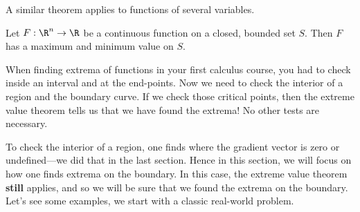 \documentclass{ximera}
\begin{document}
\begin{theorem}
\begin{image}
\end{image}
\end{theorem}

A similar theorem applies to functions of several variables.

\begin{theorem}
  Let $F:\R^n\to\R$ be a continuous function on a closed, bounded set
  $S$. Then $F$ has a maximum and minimum value on $S$.
\end{theorem}

When finding extrema of functions in your first calculus course, you
had to check inside an interval and at the end-points. Now we need to
check the interior of a region and the boundary curve. If we check
those critical points, then the extreme value theorem tells us that we
have found the extrema! No other tests are necessary.


To check the interior of a region, one finds where the gradient vector
is zero or undefined---we did that in the last section. Hence in this
section, we will focus on how one finds extrema on the boundary. In
this case, the extreme value theorem \textbf{still} applies, and so we
will be sure that we found the extrema on the boundary.  Let's see
some examples, we start with a classic real-world problem.
\end{document}
